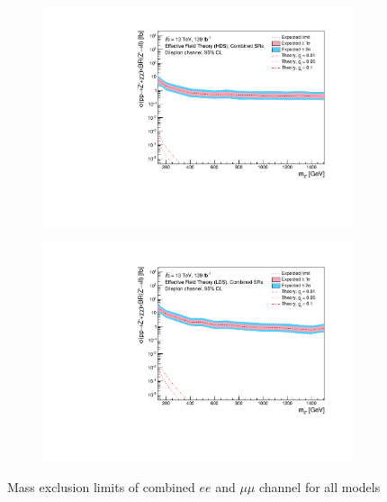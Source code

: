 \documentclass[12pt, a4paper]{book}
\begin{document}
\begin{figure}[!ht]
\begin{subfigure}[b]{0.49\textwidth}
      \includegraphics[width=1\textwidth]{Limits/Model_independent/EFT_HDS/mass_exclusion_comb.pdf}
   \end{subfigure}
   \hfill
   \begin{subfigure}[b]{0.49\textwidth}
      \centering
      \includegraphics[width=1\textwidth]{Limits/Model_independent/EFT_LDS/mass_exclusion_comb.pdf}
   \end{subfigure}
   \caption[Mass exclusion limits of combined $ee$ and $\mu\mu$ channel for all models]{Mass exclusion limits of combined $ee$ and $\mu\mu$ channel for all models}
\end{figure}
\clearpage
\end{document}
